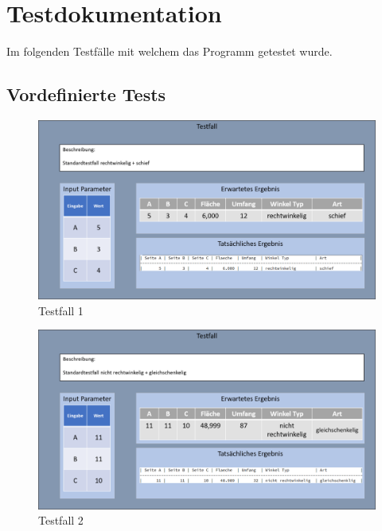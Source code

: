\chapter{Testdokumentation}\label{ch:testdokumentation}
Im folgenden Testfälle mit welchem das Programm getestet wurde.



\section{Vordefinierte Tests}\label{sec:definierte_tests}




\begin{figure}
    \centering
    \includegraphics[width=\linewidth]{images/Testfall1.png}
    \caption{Testfall 1}
\end{figure}

\begin{figure}
    \centering
    \includegraphics[width=\linewidth]{images/Testfall2.png}
    \caption{Testfall 2}
\end{figure}

